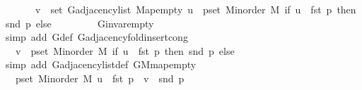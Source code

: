 \begin{isabellebody}
\ \ \ \ \ \ \ v\ {\isasymin}\ set\ {\isacharparenleft}{\kern0pt}G{\isachardot}{\kern0pt}adjacency{\isacharunderscore}{\kern0pt}list\ Map{\isacharunderscore}{\kern0pt}empty\ u{\isacharparenright}{\kern0pt}\ {\isasymunion}\ {\isacharparenleft}{\kern0pt}{\isasymUnion}p{\isasymin}set\ {\isacharparenleft}{\kern0pt}M{\isacharunderscore}{\kern0pt}inorder\ M{\isacharparenright}{\kern0pt}{\isachardot}{\kern0pt}\ if\ u\ {\isacharequal}{\kern0pt}\ fst\ p\ then\ {\isacharbraceleft}{\kern0pt}snd\ p{\isacharbraceright}{\kern0pt}\ else\ {\isacharbraceleft}{\kern0pt}{\isacharbraceright}{\kern0pt}{\isacharparenright}{\kern0pt}{\isachardoublequoteclose}\isanewline
\ \ \ \ \ \ \isamarkupfalse%
\ G{\isachardot}{\kern0pt}invar{\isacharunderscore}{\kern0pt}empty\isanewline
\ \ \ \ \ \ \isamarkupfalse%
\ {\isacharparenleft}{\kern0pt}simp\ add{\isacharcolon}{\kern0pt}\ G{}{\isacharunderscore}{\kern0pt}{}{\isacharunderscore}{\kern0pt}def\ G{\isachardot}{\kern0pt}adjacency{\isacharunderscore}{\kern0pt}fold{\isacharunderscore}{\kern0pt}insert{\isacharunderscore}{\kern0pt}cong{\isacharparenright}{\kern0pt}\isanewline
\ \ \ \ \isamarkupfalse%
\ \isamarkupfalse%
\ {\isachardoublequoteopen}{\isachardot}{\kern0pt}{\isachardot}{\kern0pt}{\isachardot}{\kern0pt}\ {\isasymlongleftrightarrow}\ v\ {\isasymin}\ {\isacharparenleft}{\kern0pt}{\isasymUnion}p{\isasymin}set\ {\isacharparenleft}{\kern0pt}M{\isacharunderscore}{\kern0pt}inorder\ M{\isacharparenright}{\kern0pt}{\isachardot}{\kern0pt}\ if\ u\ {\isacharequal}{\kern0pt}\ fst\ p\ then\ {\isacharbraceleft}{\kern0pt}snd\ p{\isacharbraceright}{\kern0pt}\ else\ {\isacharbraceleft}{\kern0pt}{\isacharbraceright}{\kern0pt}{\isacharparenright}{\kern0pt}{\isachardoublequoteclose}\isanewline
\ \ \ \ \ \ \isamarkupfalse%
\ {\isacharparenleft}{\kern0pt}simp\ add{\isacharcolon}{\kern0pt}\ G{\isachardot}{\kern0pt}adjacency{\isacharunderscore}{\kern0pt}list{\isacharunderscore}{\kern0pt}def\ G{\isachardot}{\kern0pt}M{\isachardot}{\kern0pt}map{\isacharunderscore}{\kern0pt}empty{\isacharparenright}{\kern0pt}\isanewline
\ \ \ \ \isamarkupfalse%
\ \isamarkupfalse%
\ {\isachardoublequoteopen}{\isachardot}{\kern0pt}{\isachardot}{\kern0pt}{\isachardot}{\kern0pt}\ {\isasymlongleftrightarrow}\ {\isacharparenleft}{\kern0pt}{\isasymexists}p{\isasymin}set\ {\isacharparenleft}{\kern0pt}M{\isacharunderscore}{\kern0pt}inorder\ M{\isacharparenright}{\kern0pt}{\isachardot}{\kern0pt}\ u\ {\isacharequal}{\kern0pt}\ fst\ p\ {\isasymand}\ v\ {\isacharequal}{\kern0pt}\ snd\ p{\isacharparenright}{\kern0pt}{\isachardoublequoteclose}\isanewline

\end{isabellebody}
